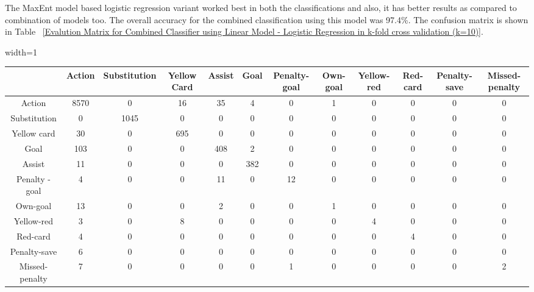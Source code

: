 \documentclass[11pt,letterpaper]{article}
\begin{document}
The MaxEnt model based logistic regression variant worked best in both the classifications and also, it has better results as compared to combination of models too. The overall accuracy for the combined classification using this model was 97.4\%. The confusion matrix is shown in Table ~\ref{Evalution Matrix for Combined Classifier using Linear Model - Logistic Regression in k-fold cross validation (k=10)}.\\

\begin{table*}
\caption{Evaluation Matrix for Combined Classifier using Linear Model - Logistic Regression in k-fold cross validation (k=10)} \label{Evalution Matrix for Combined Classifier using Linear Model - Logistic Regression in k-fold cross validation (k=10)}
\begin{center}
\begin{adjustbox}{width=1\textwidth}
\begin{tabular}{ |c|c|c|c|c|c|c|c|c|c|c|c| } 
 \hline
  & Action & Substitution & Yellow Card &  Assist & Goal & Penalty-goal &  Own-goal &Yellow-red & Red-card  & Penalty-save & Missed-penalty\\ 
 \hline
 Action & 8570 & 0 & 16 & 35 & 4 & 0 & 1 & 0 & 0 & 0 & 0  \\ 
 Substitution & 0 & 1045 & 0 & 0 & 0 & 0 & 0 & 0 & 0 & 0 & 0 \\ 
 Yellow card & 30 &  0 & 695 & 0 & 0 & 0 & 0 & 0 & 0 & 0 & 0 \\ 
  Goal & 103 & 0 & 0 & 408 & 2 & 0 & 0 & 0 & 0 & 0 & 0\\
 Assist & 11 & 0 & 0 & 0 & 382 & 0 & 0 & 0 & 0 & 0 & 0 \\
  Penalty - goal & 4 &  0 & 0 & 11 & 0 & 12 & 0 & 0 & 0 & 0 & 0 \\
 Own-goal  & 13 & 0 & 0 & 2 & 0 & 0 & 1 & 0 & 0 & 0 & 0 \\
  Yellow-red & 3 & 0 & 8 & 0 & 0 & 0 & 0 & 4 & 0 & 0 & 0 \\
 Red-card & 4 & 0 & 0 & 0 & 0 & 0 & 0 & 0 & 4 & 0 & 0 \\ 
  Penalty-save & 6 & 0 & 0 & 0 & 0  & 0 & 0 & 0  & 0 & 0 & 0\\ 
  Missed-penalty & 7 & 0 &  0& 0 & 0 & 1 & 0 & 0 & 0 & 0 & 2 \\ 
 \hline
\end{tabular}
\end{adjustbox}
\end{center}
\end{table*}
\end{document}

